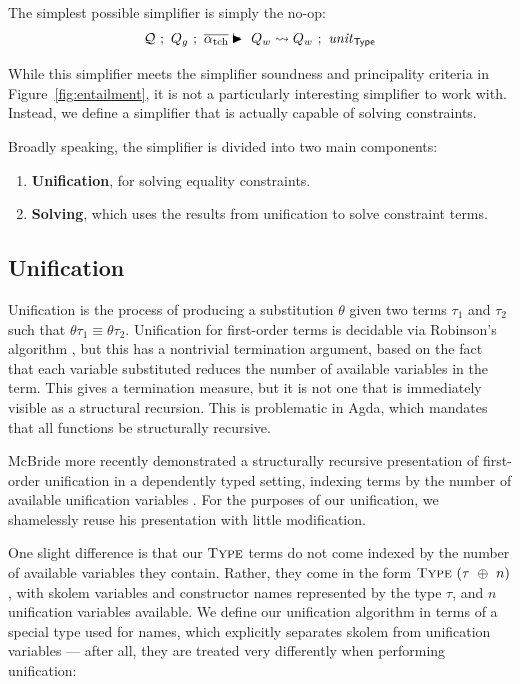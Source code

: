 \documentclass[a4paper]{jfp}
\begin{document}
The simplest possible simplifier is simply the no-op:
\begin{displaymath}
   \mathcal{Q}\ ;\ Q_g\ ;\ \overline{\alpha_\text{tch}} \vdasharrow Q_w \leadsto Q_w\ ;\ \mathit{unit}_\textsf{Type}
\end{displaymath}

While this simplifier meets the simplifier soundness and principality criteria in Figure~\ref{fig:entailment}, it is not a particularly interesting
simplifier to work with. Instead, we define a simplifier that is actually capable of solving constraints. 

Broadly speaking, the simplifier is divided into two main components:

\begin{enumerate}
      \item \textbf{Unification}, for solving equality constraints. 
      \item \textbf{Solving}, which uses the results from unification to solve constraint terms.
\end{enumerate}

\subsection{Unification}

Unification is the process of producing a substitution $\theta$ given two terms $\tau_1$ and $\tau_2$ such that $\theta\tau_1 \equiv \theta\tau_2$.
Unification for first-order terms is decidable via Robinson's algorithm \cite{Robinson:1965:MLB:321250.321253}, but this has a nontrivial termination
argument, based on the fact that each variable substituted reduces the number of available variables in the term. This gives a termination measure,
but it is not one that is immediately visible as a structural recursion. This is problematic in Agda, which mandates that all functions be
structurally recursive. 

McBride more recently demonstrated a structurally recursive presentation of first-order unification in a dependently typed setting, indexing terms
by the number of available unification variables \cite{McBride:2003bg}. For the purposes of our unification, we shamelessly reuse his presentation
with little modification.

One slight difference is that our $\textsc{Type}$ terms do not come indexed by the number of available variables they contain. Rather, they 
come in the form $\textsc{Type}\ (\tau\ \oplus\ n)$, with skolem variables and constructor names represented by the type $\tau$, and $n$ unification 
variables available. We define our unification algorithm in terms of a special type used for names, which explicitly separates skolem from unification
variables --- after all, they are treated very differently when performing unification:
\end{document}
